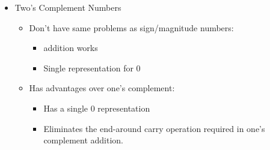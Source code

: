 \documentclass[a4paper]{article}
\begin{document}
\begin{itemize}
\begin{itemize}
\begin{itemize}
\end{itemize}
\item Two's Complement Numbers
\begin{itemize}
\item Don't have same problems as sign/magnitude numbers:
\begin{itemize}
\item addition works
\item Single representation for 0
\end{itemize}
\item Has advantages over one's complement:
\begin{itemize}
\item Has a single 0 representation
\item Eliminates the end-around carry operation required in one's complement addition.
\end{itemize}


\end{itemize}
\end{itemize}
\end{itemize}
\end{document}
